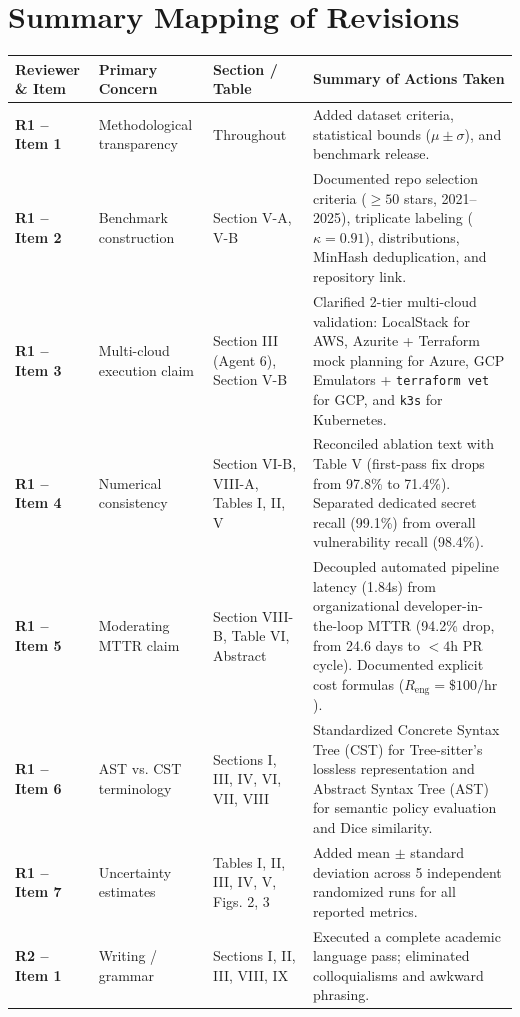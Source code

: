 \documentclass[11pt,a4paper]{article}
\begin{document}
\section*{Summary Mapping of Revisions}

\begin{center}
\small
\begin{tabular}{p{2.2cm}p{4.5cm}p{2.8cm}p{5.5cm}}
\hline\hline
\textbf{Reviewer \& Item} & \textbf{Primary Concern} & \textbf{Section / Table} & \textbf{Summary of Actions Taken} \\
\hline
\textbf{R1 -- Item 1} & Methodological transparency & Throughout & Added dataset criteria, statistical bounds ($\mu \pm \sigma$), and benchmark release. \\
\textbf{R1 -- Item 2} & Benchmark construction & Section V-A, V-B & Documented repo selection criteria ($\ge 50$ stars, 2021--2025), triplicate labeling ($\kappa=0.91$), distributions, MinHash deduplication, and repository link. \\
\textbf{R1 -- Item 3} & Multi-cloud execution claim & Section III (Agent 6), Section V-B & Clarified 2-tier multi-cloud validation: LocalStack for AWS, Azurite + Terraform mock planning for Azure, GCP Emulators + \texttt{terraform vet} for GCP, and \texttt{k3s} for Kubernetes. \\
\textbf{R1 -- Item 4} & Numerical consistency & Section VI-B, VIII-A, Tables I, II, V & Reconciled ablation text with Table V (first-pass fix drops from 97.8\% to 71.4\%). Separated dedicated secret recall (99.1\%) from overall vulnerability recall (98.4\%). \\
\textbf{R1 -- Item 5} & Moderating MTTR claim & Section VIII-B, Table VI, Abstract & Decoupled automated pipeline latency (1.84s) from organizational developer-in-the-loop MTTR (94.2\% drop, from 24.6 days to $<4$h PR cycle). Documented explicit cost formulas ($R_{\mathrm{eng}} = \$100/\text{hr}$). \\
\textbf{R1 -- Item 6} & AST vs. CST terminology & Sections I, III, IV, VI, VII, VIII & Standardized Concrete Syntax Tree (CST) for Tree-sitter's lossless representation and Abstract Syntax Tree (AST) for semantic policy evaluation and Dice similarity. \\
\textbf{R1 -- Item 7} & Uncertainty estimates & Tables I, II, III, IV, V, Figs. 2, 3 & Added mean $\pm$ standard deviation across 5 independent randomized runs for all reported metrics. \\
\textbf{R2 -- Item 1} & Writing / grammar & Sections I, II, III, VIII, IX & Executed a complete academic language pass; eliminated colloquialisms and awkward phrasing. \\

\end{tabular}
\end{center}
\end{document}
